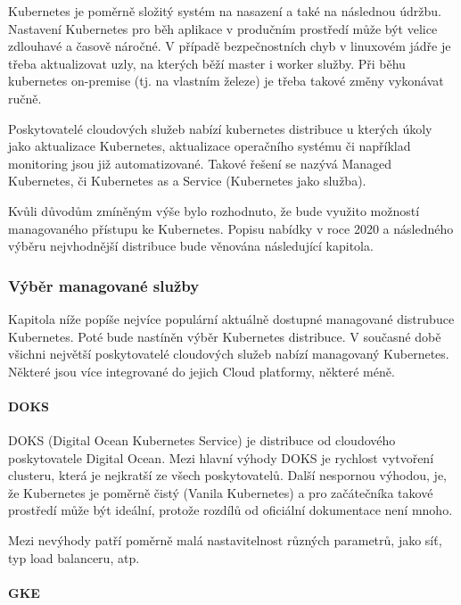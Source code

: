 \documentclass[thesis=M,czech]{FITthesis}[2019/12/23]
\theoremstyle{plain}
\theoremstyle{definition}
\begin{document}
Kubernetes je poměrně složitý systém na nasazení a také na následnou údržbu. Nastavení Kubernetes pro běh aplikace v produčním prostředí může být velice zdlouhavé a časově náročné. V případě bezpečnostních chyb v linuxovém jádře je třeba aktualizovat uzly, na kterých běží master i worker služby. Při běhu kubernetes on-premise (tj. na vlastním železe) je třeba takové změny vykonávat ručně.

Poskytovatelé cloudových služeb nabízí kubernetes distribuce u kterých úkoly jako aktualizace Kubernetes, aktualizace operačního systému či například monitoring jsou již automatizované. Takové řešení se nazývá Managed Kubernetes, či Kubernetes as a Service (Kubernetes jako služba). 

Kvůli důvodům zmíněným výše bylo rozhodnuto, že bude využito možností managovaného přístupu ke Kubernetes. Popisu nabídky v roce 2020 a následného výběru nejvhodnější distribuce bude věnována následující kapitola.


\subsubsection{Výběr managované služby}


Kapitola níže popíše nejvíce populární aktuálně dostupné managované distrubuce Kubernetes. Poté bude nastíněn výběr Kubernetes distribuce. V současné době všichni největší poskytovatelé cloudových služeb nabízí managovaný Kubernetes. Některé jsou více integrované do jejich Cloud platformy, některé méně. 

\paragraph{DOKS}

DOKS (Digital Ocean Kubernetes Service)\cite{doks} je distribuce od cloudového poskytovatele Digital Ocean. Mezi hlavní výhody DOKS je rychlost vytvoření clusteru, která je nejkratší ze všech poskytovatelů. Další nespornou výhodou, je, že Kubernetes je poměrně čistý (Vanila Kubernetes) a pro začátečníka takové prostředí může být ideální, protože rozdílů od oficiální dokumentace není mnoho. 

Mezi nevýhody patří poměrně malá nastavitelnost různých parametrů, jako síť, typ load balanceru, atp. 


\paragraph{GKE}
\end{document}
